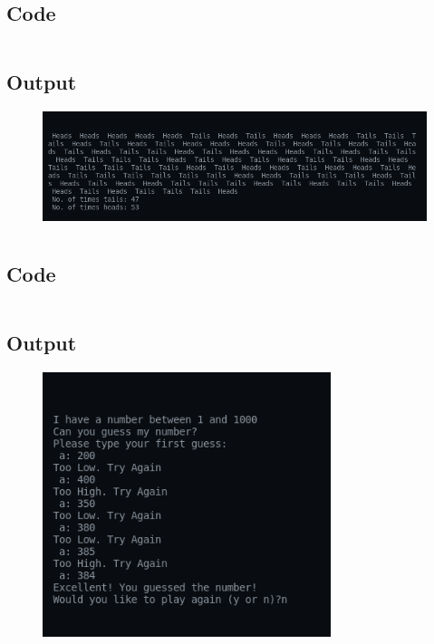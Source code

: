 \documentclass[12pt]{article}
\begin{document}
\newpage
\section{}
\subsection{Code}
\inputminted{c}{q5.c}
\subsection{Output}
\begin{figure}[h]
    \centering
    \includegraphics[width=1.0\textwidth]{5.png}
\end{figure}

\newpage
\section{}
\subsection{Code}
\inputminted{c}{q6.c}
\newpage
\subsection{Output}
\begin{figure}[h]
    \centering
    \includegraphics[width=0.75\textwidth]{6.png}
\end{figure}
\end{document}
